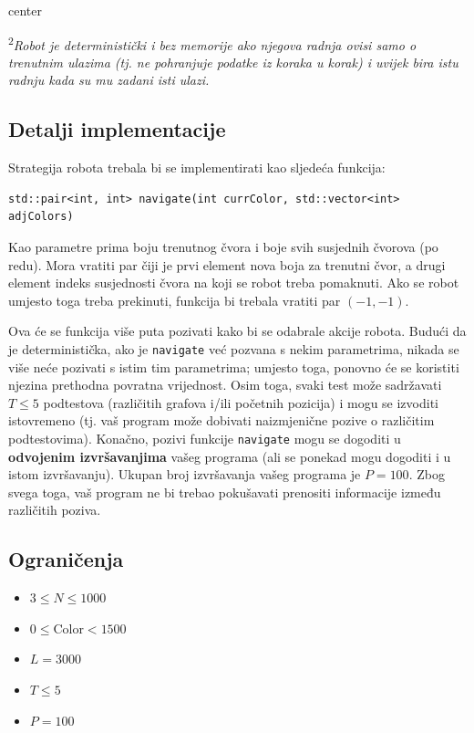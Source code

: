\documentclass[12pt]{article}
\begin{document}
\begin{adjustbox}{center}

\end{adjustbox}

\textsuperscript{2}\textit{Robot je deterministički i bez memorije ako njegova radnja ovisi samo o trenutnim ulazima (tj. ne pohranjuje podatke iz koraka u korak) i uvijek bira istu radnju kada su mu zadani isti ulazi.}

\subsection{Detalji implementacije}
Strategija robota trebala bi se implementirati kao sljedeća funkcija:
\begin{lstlisting}
std::pair<int, int> navigate(int currColor, std::vector<int> adjColors)
\end{lstlisting}

Kao parametre prima boju trenutnog čvora i boje svih susjednih čvorova (po redu). Mora vratiti par čiji je prvi element nova boja za trenutni čvor, a drugi element indeks susjednosti čvora na koji se robot treba pomaknuti. Ako se robot umjesto toga treba prekinuti, funkcija bi trebala vratiti par $(-1, -1)$.

Ova će se funkcija više puta pozivati kako bi se odabrale akcije robota. Budući da je deterministička, ako je \texttt{navigate} već pozvana s nekim parametrima, nikada se više neće pozivati s istim tim parametrima; umjesto toga, ponovno će se koristiti njezina prethodna povratna vrijednost. Osim toga, svaki test može sadržavati $T \leq 5$ podtestova (različitih grafova i/ili početnih pozicija) i mogu se izvoditi istovremeno (tj. vaš program može dobivati naizmjenične pozive o različitim podtestovima). Konačno, pozivi funkcije \texttt{navigate} mogu se dogoditi u \textbf{odvojenim izvršavanjima} vašeg programa (ali se ponekad mogu dogoditi i u istom izvršavanju). Ukupan broj izvršavanja vašeg programa je $P = 100$. Zbog svega toga, vaš program ne bi trebao pokušavati prenositi informacije između različitih poziva.

\subsection{Ograničenja}

\begin{itemize}
\item $3 \leq N \leq 1000$
\item $0 \leq \mathrm{Color} < 1500$
\item $L = 3000$
\item $T \leq 5$
\item $P = 100$
\end{itemize}
\end{document}
